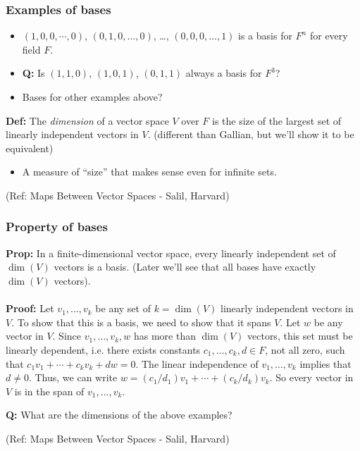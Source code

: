 \begin{frame}[fragile]
\frametitle{Examples of bases}

\begin{itemize}
\item $(1,0,0,\cdots,0)$, $(0,1,0,\ldots,0)$, \ldots, $(0,0,0,\ldots,1)$ is a basis for $F^n$ for every field $F$.
\item \textbf{Q:} Is $(1,1,0)$, $(1,0,1)$, $(0,1,1)$ always a basis for $F^3$?
\item Bases for other examples above?
\end{itemize}

\textbf{Def:}  The {\em dimension} of a vector space $V$ over $F$ is the size of the largest set of linearly independent vectors in $V$.
(different than Gallian, but we'll show it to be equivalent)
\begin{itemize}
\item A measure of ``size'' that makes sense even for infinite sets.
\end{itemize}

\tiny{(Ref: Maps Between Vector Spaces - Salil, Harvard)}
\end{frame}


\begin{frame}[fragile]
\frametitle{Property of bases}

\textbf{Prop:} In a finite-dimensional vector space, every linearly independent set of $\dim(V)$ vectors is a basis.
(Later we'll see that all bases have exactly
$\dim(V)$ vectors).\\
\ \\
\textbf{Proof:} Let $v_1,\ldots,v_k$ be any set of $k=\dim(V)$ linearly independent vectors in $V$.  To show that this is a
basis, we need to show that it spans $V$.  Let $w$ be any vector in $V$.  Since $v_1,\ldots,v_k,w$ has more than $\dim(V)$ vectors, this set must be linearly dependent, i.e. there exists constants $c_1,\ldots,c_k,d\in F$, not all zero, such that $c_1v_1+\cdots+c_kv_k+dw=0$.  The linear
independence of $v_1,\ldots,v_k$ implies that $d\neq 0$.  Thus, we can write $w=(c_1/d_1)v_1+\cdots+(c_k/d_k)v_k$.  So every vector in
$V$ is in the span of $v_1,\ldots,v_k$.

 \textbf{Q:} What are the dimensions of the above examples?


\tiny{(Ref: Maps Between Vector Spaces - Salil, Harvard)}
\end{frame}


